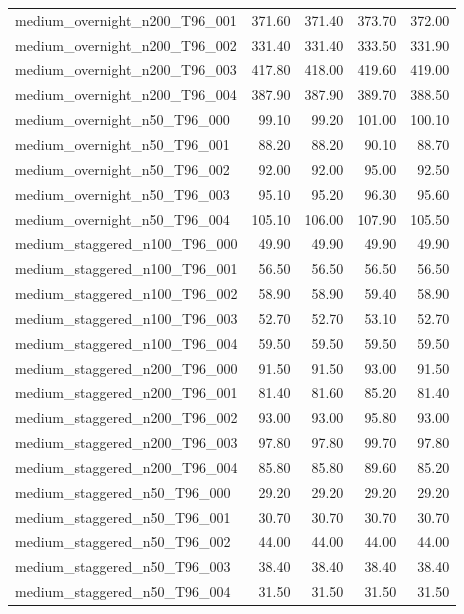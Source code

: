 \begin{table}[htbp]
\begin{tabular}{lrrrr}
medium\_overnight\_n200\_T96\_001 & 371.60 & 371.40 & 373.70 & 372.00 \\
medium\_overnight\_n200\_T96\_002 & 331.40 & 331.40 & 333.50 & 331.90 \\
medium\_overnight\_n200\_T96\_003 & 417.80 & 418.00 & 419.60 & 419.00 \\
medium\_overnight\_n200\_T96\_004 & 387.90 & 387.90 & 389.70 & 388.50 \\
medium\_overnight\_n50\_T96\_000 & 99.10 & 99.20 & 101.00 & 100.10 \\
medium\_overnight\_n50\_T96\_001 & 88.20 & 88.20 & 90.10 & 88.70 \\
medium\_overnight\_n50\_T96\_002 & 92.00 & 92.00 & 95.00 & 92.50 \\
medium\_overnight\_n50\_T96\_003 & 95.10 & 95.20 & 96.30 & 95.60 \\
medium\_overnight\_n50\_T96\_004 & 105.10 & 106.00 & 107.90 & 105.50 \\
medium\_staggered\_n100\_T96\_000 & 49.90 & 49.90 & 49.90 & 49.90 \\
medium\_staggered\_n100\_T96\_001 & 56.50 & 56.50 & 56.50 & 56.50 \\
medium\_staggered\_n100\_T96\_002 & 58.90 & 58.90 & 59.40 & 58.90 \\
medium\_staggered\_n100\_T96\_003 & 52.70 & 52.70 & 53.10 & 52.70 \\
medium\_staggered\_n100\_T96\_004 & 59.50 & 59.50 & 59.50 & 59.50 \\
medium\_staggered\_n200\_T96\_000 & 91.50 & 91.50 & 93.00 & 91.50 \\
medium\_staggered\_n200\_T96\_001 & 81.40 & 81.60 & 85.20 & 81.40 \\
medium\_staggered\_n200\_T96\_002 & 93.00 & 93.00 & 95.80 & 93.00 \\
medium\_staggered\_n200\_T96\_003 & 97.80 & 97.80 & 99.70 & 97.80 \\
medium\_staggered\_n200\_T96\_004 & 85.80 & 85.80 & 89.60 & 85.20 \\
medium\_staggered\_n50\_T96\_000 & 29.20 & 29.20 & 29.20 & 29.20 \\
medium\_staggered\_n50\_T96\_001 & 30.70 & 30.70 & 30.70 & 30.70 \\
medium\_staggered\_n50\_T96\_002 & 44.00 & 44.00 & 44.00 & 44.00 \\
medium\_staggered\_n50\_T96\_003 & 38.40 & 38.40 & 38.40 & 38.40 \\
medium\_staggered\_n50\_T96\_004 & 31.50 & 31.50 & 31.50 & 31.50 \\
\bottomrule
\end{tabular}
\end{table}
